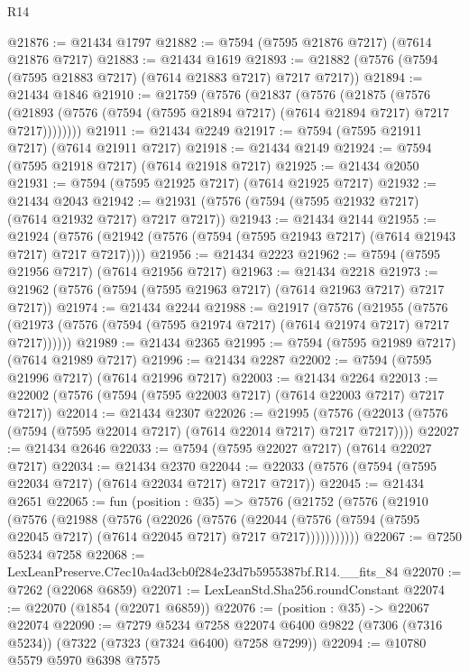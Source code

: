 \begin{lexlean}{R14}
\begin{coremodule}
@21876 := @21434 @1797
@21882 := @7594 (@7595 @21876 @7217) (@7614 @21876 @7217)
@21883 := @21434 @1619
@21893 := @21882 (@7576 (@7594 (@7595 @21883 @7217) (@7614 @21883 @7217) @7217 @7217))
@21894 := @21434 @1846
@21910 := @21759
    (@7576
      (@21837
        (@7576
          (@21875
            (@7576
              (@21893 (@7576 (@7594 (@7595 @21894 @7217) (@7614 @21894 @7217) @7217 @7217))))))))
@21911 := @21434 @2249
@21917 := @7594 (@7595 @21911 @7217) (@7614 @21911 @7217)
@21918 := @21434 @2149
@21924 := @7594 (@7595 @21918 @7217) (@7614 @21918 @7217)
@21925 := @21434 @2050
@21931 := @7594 (@7595 @21925 @7217) (@7614 @21925 @7217)
@21932 := @21434 @2043
@21942 := @21931 (@7576 (@7594 (@7595 @21932 @7217) (@7614 @21932 @7217) @7217 @7217))
@21943 := @21434 @2144
@21955 := @21924
    (@7576 (@21942 (@7576 (@7594 (@7595 @21943 @7217) (@7614 @21943 @7217) @7217 @7217))))
@21956 := @21434 @2223
@21962 := @7594 (@7595 @21956 @7217) (@7614 @21956 @7217)
@21963 := @21434 @2218
@21973 := @21962 (@7576 (@7594 (@7595 @21963 @7217) (@7614 @21963 @7217) @7217 @7217))
@21974 := @21434 @2244
@21988 := @21917
    (@7576
      (@21955
        (@7576 (@21973 (@7576 (@7594 (@7595 @21974 @7217) (@7614 @21974 @7217) @7217 @7217))))))
@21989 := @21434 @2365
@21995 := @7594 (@7595 @21989 @7217) (@7614 @21989 @7217)
@21996 := @21434 @2287
@22002 := @7594 (@7595 @21996 @7217) (@7614 @21996 @7217)
@22003 := @21434 @2264
@22013 := @22002 (@7576 (@7594 (@7595 @22003 @7217) (@7614 @22003 @7217) @7217 @7217))
@22014 := @21434 @2307
@22026 := @21995
    (@7576 (@22013 (@7576 (@7594 (@7595 @22014 @7217) (@7614 @22014 @7217) @7217 @7217))))
@22027 := @21434 @2646
@22033 := @7594 (@7595 @22027 @7217) (@7614 @22027 @7217)
@22034 := @21434 @2370
@22044 := @22033 (@7576 (@7594 (@7595 @22034 @7217) (@7614 @22034 @7217) @7217 @7217))
@22045 := @21434 @2651
@22065 := fun (position : @35) =>
  @7576
    (@21752
      (@7576
        (@21910
          (@7576
            (@21988
              (@7576
                (@22026
                  (@7576
                    (@22044
                      (@7576 (@7594 (@7595 @22045 @7217) (@7614 @22045 @7217) @7217 @7217)))))))))))
@22067 := @7250 @5234 @7258
@22068 := LexLeanPreserve.C7ec10a4ad3cb0f284e23d7b5955387bf.R14.__fits_84
@22070 := @7262 (@22068 @6859)
@22071 := LexLeanStd.Sha256.roundConstant
@22074 := @22070 (@1854 (@22071 @6859))
@22076 := (position : @35) -> @22067 @22074
@22090 := @7279
    @5234
    @7258
    @22074
    @6400
    @9822
    (@7306 (@7316 @5234))
    (@7322 (@7323 (@7324 @6400) @7258 @7299))
@22094 := @10780 @5579 @5970 @6398 @7575

\end{coremodule}
\end{lexlean}

